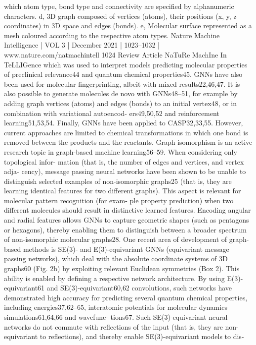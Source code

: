 which atom type, bond type and connectivity are specified by alphanumeric
characters. d, 3D graph composed of vertices (atoms), their positions (x,
y, z coordinates) in 3D space and edges (bonds). e, Molecular surface
represented as a mesh coloured according to the respective atom types.
Nature Machine Intelligence | VOL 3 | December 2021 | 1023–1032 | www.nature.com/natmachintell
1024
Review Article
NaTuRe MachIne In TeLLIGence
which was used to interpret models predicting molecular properties
of preclinical relevance44 and quantum chemical properties45. GNNs
have also been used for molecular fingerprinting, albeit with mixed
results22,46,47.
It is also possible to generate molecules de novo with GNNs48–51,
for example by adding graph vertices (atoms) and edges (bonds) to
an initial vertex48, or in combination with variational autoencod-
ers49,50,52 and reinforcement learning51,53,54. Finally, GNNs have been
applied to CASP32,33,55. However, current approaches are limited to
chemical transformations in which one bond is removed between
the products and the reactants.
Graph isomorphism is an active research topic in graph-based
machine learning56–59. When considering only topological infor-
mation (that is, the number of edges and vertices, and vertex adja-
cency), message passing neural networks have been shown to be
unable to distinguish selected examples of non-isomorphic graphs25
(that is, they are learning identical features for two different graphs).
This aspect is relevant for molecular pattern recognition (for exam-
ple property prediction) when two different molecules should result
in distinctive learned features. Encoding angular and radial features
allows GNNs to capture geometric shapes (such as pentagons or
hexagons), thereby enabling them to distinguish between a broader
spectrum of non-isomorphic molecular graphs28.
One recent area of development of graph-based methods is SE(3)-
and E(3)-equivariant GNNs (equivariant message passing networks),
which deal with the absolute coordinate systems of 3D graphs60
(Fig. 2b) by exploiting relevant Euclidean symmetries (Box 2). This
ability is enabled by defining a respective network architecture. By
using E(3)-equivariant61 and SE(3)-equivariant60,62 convolutions, such
networks have demonstrated high accuracy for predicting several
quantum chemical properties, including energies37,62–65, interatomic
potentials for molecular dynamics simulations61,64,66 and wavefunc-
tions67. Such SE(3)-equivariant neural networks do not commute
with reflections of the input (that is, they are non-equivariant to
reflections), and thereby enable SE(3)-equivariant models to dis-
